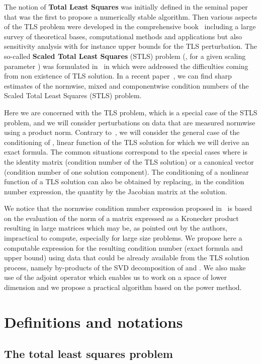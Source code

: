 \documentclass[a4paper]{article}
\begin{document}
The notion of {\bf Total Least Squares} was initially defined in the seminal paper~\cite{GVL.80} that was the first to propose a numerically stable algorithm. Then various aspects of the TLS problem were developed in the comprehensive book~\cite{vava91} including a large survey of theoretical bases, computational methods and applications but also sensitivity analysis with for instance upper bounds for the TLS perturbation.
The so-called {\bf Scaled Total Least Squares} (STLS) problem
(,
for a given scaling parameter )
was formulated in~\cite{CORE} in which were addressed the difficulties coming from non existence of TLS solution.
In a recent paper~\cite{WEI.09}, we can find sharp estimates of the normwise, mixed and componentwise
condition numbers of the Scaled Total Least Squares (STLS) problem.

Here we are concerned with the TLS problem, which is a special case of the STLS problem,
and we will consider perturbations on data  that are measured normwise using a product norm.
Contrary to~\cite{WEI.09}, we will consider the general case of the conditioning of ,
linear function of the TLS solution for which we will derive an exact formula.
The common situations correspond to the special cases where  is the identity matrix
(condition number of the TLS solution) or a canonical vector
(condition number of one solution component).
The conditioning of a nonlinear function of a TLS solution can also be obtained
by replacing, in the condition number expression, the quantity  by the Jacobian matrix at the solution.

We notice that the normwise condition number expression proposed in~\cite{WEI.09} is based on the evaluation of the norm of a matrix expressed as a Kronecker product resulting in large matrices which may be, as pointed out by the authors, impractical to compute, especially for large size problems.
We propose here a computable expression for the resulting condition number (exact formula and upper bound) using data that could be already available from the TLS solution process, namely by-products of the SVD decomposition of  and .
We also make use of the adjoint operator which enables us to work on a space of lower dimension
and we propose a practical algorithm based on the power method.

\section{Definitions and notations}
\subsection{The total least squares problem}
\end{document}
